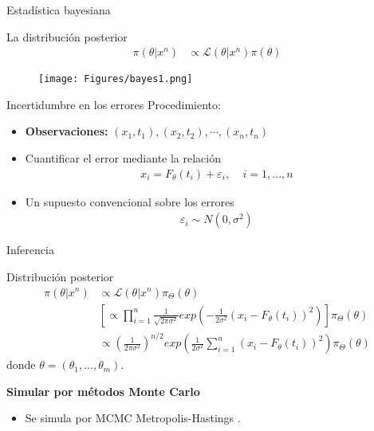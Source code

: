 \documentclass[10pt,aspectratio=169]{beamer}
\begin{document}
\begin{frame}[fragile]{Estadística bayesiana}
  
  La distribución posterior 
  \begin{align*}
      \pi(\theta|x^n) &\propto \mathcal{L}(\theta|x^n) \pi(\theta)
  \end{align*}
  

\begin{figure}[H] 
    \centering 
    \texttt{[image: Figures/bayes1.png]} 
\end{figure} 




\end{frame}

\begin{frame}[fragile]{Incertidumbre en los errores}
  Procedimiento:
  \begin{itemize}
    \item 
    \textbf{Observaciones:} $(x_1, t_1), (x_2,t_2), \cdots, (x_n, t_n)$ 
    \item 
    Cuantificar el error mediante la relación
    \begin{align*}
        x_i = F_\theta (t_i) + \varepsilon_i, \:\:\:\:\: i = 1,...,n
    \end{align*}
    \item Un supuesto convencional sobre los errores
    \begin{align*}
        \varepsilon_i \sim N(0,\sigma^2)
        \label{3.02}
    \end{align*}

  \end{itemize}

\end{frame}

\begin{frame}[fragile]{Inferencia}
  
  Distribución posterior 
  \begin{align*}
      \pi(\theta|x^n) &\propto \mathcal{L}(\theta|x^n) \pi_{\Theta}(\theta)\\
      & \left[\propto \prod_{i=1}^n \frac{1}{\sqrt{2\pi \sigma^2}} exp \left({-\frac{1}{2\sigma^2}\left(x_i - F_{\theta}(t_i)\right)^2 }\right)\right] \pi_{\Theta}(\theta) \\
      & \propto \left(\frac{1}{2\pi\sigma^2}\right)^{n/2} exp {\left(\frac{1}{2\sigma^2} \sum_{i =1}^{n}\left(x_i - F_{\theta}(t_i)\right) ^2\right) } \pi_{\Theta}(\theta)
  \end{align*}
  donde $\theta = (\theta_1, ..., \theta_m)$.
  
  \vspace{1 cm}

  \textbf{Simular por métodos Monte Carlo}
  \begin{itemize}
    \item 
    Se simula por MCMC Metropolis-Hastings \cite{robert1999monte}.
  \end{itemize}


\end{frame}
\end{document}
